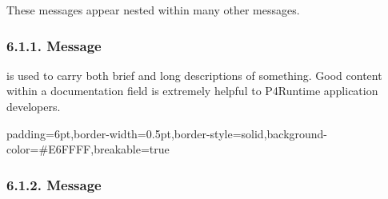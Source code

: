 \documentclass[11pt]{article}
\begin{document}
{%
\noindent{}These messages appear nested within many other messages.%

\subsubsection{6.1.1.\hspace*{0.5em} Message}\label{sec-documentation-message}%

\noindent{} is used to carry both brief and long descriptions of something.
Good content within a documentation field is extremely helpful to P4Runtime
application developers.%

\begin{mdbmargintb}{6pt}{6pt}%
\begin{mdblock}{padding=6pt,border-width=0.5pt,border-style=solid,background-color=\#E6FFFF,breakable=true}%
\begin{mdpre}%
\end{mdpre}%
\end{mdblock}%
\end{mdbmargintb}%

\subsubsection{6.1.2.\hspace*{0.5em} Message}\label{sec-preamble-message}%

}
\end{document}
